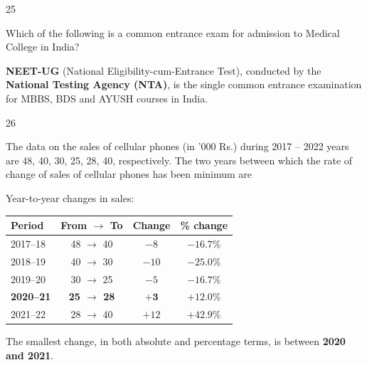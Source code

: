 \begin{question}{25}
{Which of the following is a common entrance exam for admission to Medical College in India?\par}
\begin{explain}
\textbf{NEET-UG} (National Eligibility-cum-Entrance Test), conducted by the \textbf{National Testing Agency (NTA)}, is the single common entrance examination for MBBS, BDS and AYUSH courses in India.
\end{explain}
\end{question}

\begin{question}{26}
{The data on the sales of cellular phones (in '000 Rs.) during 2017 -- 2022 years are 48, 40, 30, 25, 28, 40, respectively. The two years between which the rate of change of sales of cellular phones has been minimum are\par}
\begin{explain}
Year-to-year changes in sales:
\begin{center}\small
\begin{tabular}{lccc}\toprule
Period & From $\rightarrow$ To & Change & \% change\\\midrule
2017--18 & 48 $\rightarrow$ 40 & $-8$ & $-16.7\%$\\
2018--19 & 40 $\rightarrow$ 30 & $-10$ & $-25.0\%$\\
2019--20 & 30 $\rightarrow$ 25 & $-5$ & $-16.7\%$\\
\textbf{2020--21} & \textbf{25 $\rightarrow$ 28} & $\mathbf{+3}$ & $\mathbf{+12.0\%}$\\
2021--22 & 28 $\rightarrow$ 40 & $+12$ & $+42.9\%$\\\bottomrule
\end{tabular}
\end{center}
The smallest change, in both absolute and percentage terms, is between \textbf{2020 and 2021}.
\end{explain}
\end{question}

